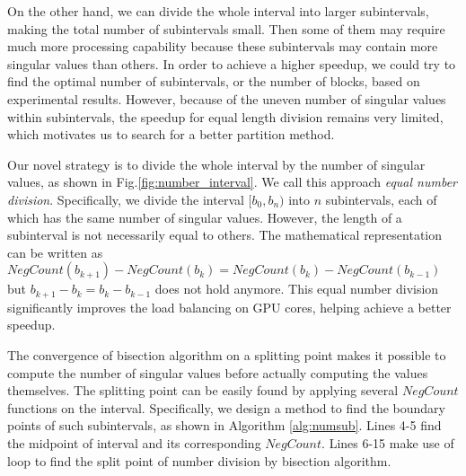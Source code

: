 On the other hand, we can divide the whole interval into larger subintervals, making the total number of subintervals small. 
Then some of them may require much more processing capability
because these subintervals may contain more singular values than others.
In order to achieve a higher speedup, we could try to find the optimal number of subintervals, or the number of blocks, based on experimental results. 
However, because of the uneven number of singular values within subintervals, the speedup for equal length division remains very limited, which motivates us to search for a better partition method.

Our novel strategy is to divide the whole interval by the number of singular values, as shown in Fig.\ref{fig:number_interval}. We call this approach {\it equal number division}. 
Specifically, we divide the interval $[b_0,b_n)$ into $n$ subintervals, each of which has the same number of singular values. 
However, the length of a subinterval is not necessarily equal to others.
The mathematical representation can be written as %
$NegCount(b_{k+1})-NegCount(b_{k}) = NegCount(b_{k})-NegCount(b_{k-1})$
but $b_{k+1}-b_k = b_{k}-b_{k-1}$ does not hold anymore.
This equal number division significantly improves the load balancing on GPU cores, helping achieve a better speedup.

The convergence of bisection algorithm on a splitting point makes it possible to compute the number of singular values before actually computing
the values themselves. The splitting point can be easily found by applying several $NegCount$ functions on the interval. Specifically, we design a method to find the boundary points of such subintervals, as shown in Algorithm \ref{alg:numsub}.
Lines 4-5 find the midpoint of interval and its corresponding $NegCount$.
Lines 6-15 make use of loop to find the split point of number division by bisection algorithm.


